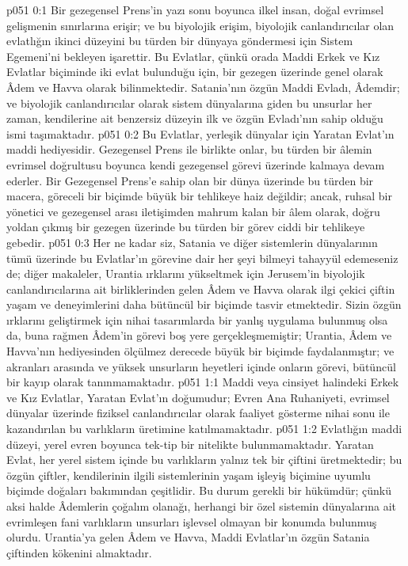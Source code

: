\vs p051 0:1 Bir gezegensel Prens’in yazı sonu boyunca ilkel insan, doğal evrimsel gelişmenin sınırlarına erişir; ve bu biyolojik erişim, biyolojik canlandırıcılar olan evlatlığın ikinci düzeyini bu türden bir dünyaya göndermesi için Sistem Egemeni’ni bekleyen işarettir. Bu Evlatlar, çünkü orada Maddi Erkek ve Kız Evlatlar biçiminde iki evlat bulunduğu için, bir gezegen üzerinde genel olarak Âdem ve Havva olarak bilinmektedir. Satania’nın özgün Maddi Evladı, Âdemdir; ve biyolojik canlandırıcılar olarak sistem dünyalarına giden bu unsurlar her zaman, kendilerine ait benzersiz düzeyin ilk ve özgün Evladı’nın sahip olduğu ismi taşımaktadır.
\vs p051 0:2 Bu Evlatlar, yerleşik dünyalar için Yaratan Evlat’ın maddi hediyesidir. Gezegensel Prens ile birlikte onlar, bu türden bir âlemin evrimsel doğrultusu boyunca kendi gezegensel görevi üzerinde kalmaya devam ederler. Bir Gezegensel Prens’e sahip olan bir dünya üzerinde bu türden bir macera, göreceli bir biçimde büyük bir tehlikeye haiz değildir; ancak, ruhsal bir yönetici ve gezegensel arası iletişimden mahrum kalan bir âlem olarak, doğru yoldan çıkmış bir gezegen üzerinde bu türden bir görev ciddi bir tehlikeye gebedir.
\vs p051 0:3 Her ne kadar siz, Satania ve diğer sistemlerin dünyalarının tümü üzerinde bu Evlatlar’ın görevine dair her şeyi bilmeyi tahayyül edemeseniz de; diğer makaleler, Urantia ırklarını yükseltmek için Jerusem’in biyolojik canlandırıcılarına ait birliklerinden gelen Âdem ve Havva olarak ilgi çekici çiftin yaşam ve deneyimlerini daha bütüncül bir biçimde tasvir etmektedir. Sizin özgün ırklarını geliştirmek için nihai tasarımlarda bir yanlış uygulama bulunmuş olsa da, buna rağmen Âdem’in görevi boş yere gerçekleşmemiştir; Urantia, Âdem ve Havva’nın hediyesinden ölçülmez derecede büyük bir biçimde faydalanmıştır; ve akranları arasında ve yüksek unsurların heyetleri içinde onların görevi, bütüncül bir kayıp olarak tanınmamaktadır.
\vs p051 1:1 Maddi veya cinsiyet halindeki Erkek ve Kız Evlatlar, Yaratan Evlat’ın doğumudur; Evren Ana Ruhaniyeti, evrimsel dünyalar üzerinde fiziksel canlandırıcılar olarak faaliyet gösterme nihai sonu ile kazandırılan bu varlıkların üretimine katılmamaktadır.
\vs p051 1:2 Evlatlığın maddi düzeyi, yerel evren boyunca tek\hyp{}tip bir nitelikte bulunmamaktadır. Yaratan Evlat, her yerel sistem içinde bu varlıkların yalnız tek bir çiftini üretmektedir; bu özgün çiftler, kendilerinin ilgili sistemlerinin yaşam işleyiş biçimine uyumlu biçimde doğaları bakımından çeşitlidir. Bu durum gerekli bir hükümdür; çünkü aksi halde Âdemlerin çoğalım olanağı, herhangi bir özel sistemin dünyalarına ait evrimleşen fani varlıkların unsurları işlevsel olmayan bir konumda bulunmuş olurdu. Urantia’ya gelen Âdem ve Havva, Maddi Evlatlar’ın özgün Satania çiftinden kökenini almaktadır.

